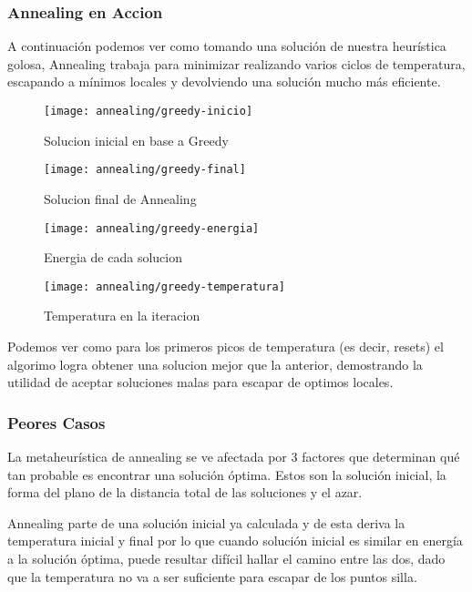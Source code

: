 \subsubsection{Annealing en Accion}

A continuación podemos ver como tomando una solución de nuestra heurística golosa, Annealing trabaja para minimizar realizando varios ciclos de temperatura, escapando a mínimos locales y devolviendo una solución mucho más eficiente.

\begin{figure}[H]
	\centering
	\begin{minipage}[t]{.45\textwidth}
		\centering
		\texttt{[image: annealing/greedy-inicio]}
		\caption{Solucion inicial en base a Greedy}
	\end{minipage}\qquad
	\begin{minipage}[t]{.45\textwidth}
		\centering
		\texttt{[image: annealing/greedy-final]}
		\caption{Solucion final de Annealing}
	\end{minipage}
	
		\centering
	\begin{minipage}[t]{.45\textwidth}
		\centering
		\texttt{[image: annealing/greedy-energia]}
		\caption{Energia de cada solucion}
	\end{minipage}\qquad
	\begin{minipage}[t]{.45\textwidth}
		\centering
		\texttt{[image: annealing/greedy-temperatura]}
		\caption{Temperatura en la iteracion}
	\end{minipage}
\end{figure}	

Podemos ver como para los primeros picos de temperatura (es decir, resets) el algorimo logra obtener una solucion mejor que la anterior, demostrando la utilidad de aceptar soluciones malas para escapar de optimos locales.



\subsubsection{Peores Casos}

La metaheurística de annealing se ve afectada por 3 factores que determinan qué tan probable es encontrar una solución óptima. Estos son la solución inicial, la forma del plano de la distancia total de las soluciones y el azar.

Annealing parte de una solución inicial ya calculada y de esta deriva la temperatura inicial y final por lo que cuando solución inicial es similar en energía a la solución óptima, puede resultar difícil hallar el camino entre las dos, dado que la temperatura no va a ser suficiente para escapar de los puntos silla.

